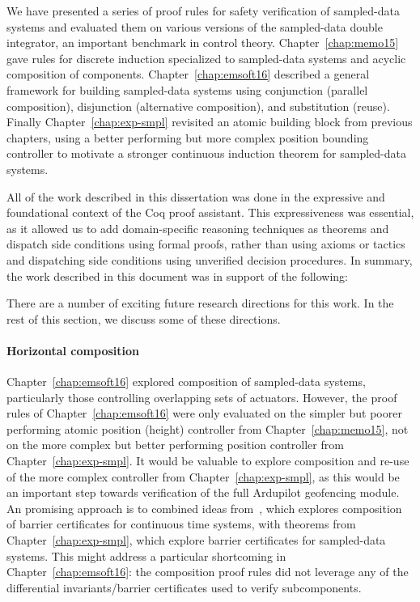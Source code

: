 We have presented a series of proof rules for safety verification of
sampled-data systems and evaluated them on various versions of the
sampled-data double integrator, an important benchmark in control
theory. Chapter~\ref{chap:memo15} gave rules for discrete induction
specialized to sampled-data systems and acyclic composition of
components. Chapter~\ref{chap:emsoft16} described a general framework for
building sampled-data systems using conjunction (parallel composition),
disjunction (alternative composition), and substitution (reuse). Finally
Chapter~\ref{chap:exp-smpl} revisited an atomic building block from
previous chapters, using a better performing but more complex position
bounding controller to motivate a stronger continuous induction theorem for
sampled-data systems.

All of the work described in this dissertation was done in the expressive
and foundational context of the Coq proof assistant. This expressiveness
was essential, as it allowed us to add domain-specific reasoning techniques
as theorems and dispatch side conditions using formal proofs, rather than
using axioms or tactics and dispatching side conditions using unverified
decision procedures. In summary, the work described in this document was in
support of the following:

\thesis

There are a number of exciting future research directions for this work. In
the rest of this section, we discuss some of these directions.

\paragraph{Horizontal composition}
Chapter~\ref{chap:emsoft16} explored composition of sampled-data systems,
particularly those controlling overlapping sets of actuators. However, the
proof rules of Chapter~\ref{chap:emsoft16} were only evaluated on the
simpler but poorer performing atomic position (height) controller from
Chapter~\ref{chap:memo15}, not on the more complex but better performing
position controller from Chapter~\ref{chap:exp-smpl}. It would be valuable
to explore composition and re-use of the more complex controller from
Chapter~\ref{chap:exp-smpl}, as this would be an important step towards
verification of the full Ardupilot geofencing module. An promising approach
is to combined ideas from~\cite{xu16sharing}, which explores composition of
barrier certificates for continuous time systems, with theorems from
Chapter~\ref{chap:exp-smpl}, which explore barrier certificates for
sampled-data systems. This might address a particular shortcoming in
Chapter~\ref{chap:emsoft16}: the composition proof rules did not leverage
any of the differential invariants/barrier certificates used to verify
subcomponents.

